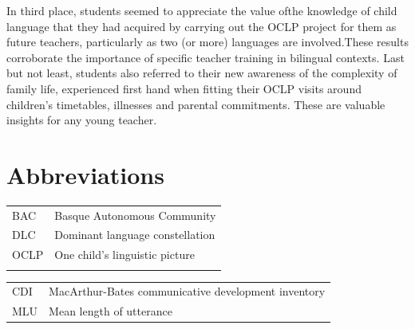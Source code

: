\documentclass[output=paper]{../langscibook}
\begin{document}
In third place, students seemed to appreciate the value ofthe knowledge of child language that they had acquired by carrying out the OCLP project for them as future teachers, particularly as two (or more) languages are involved.These results corroborate the importance of specific teacher training in bilingual contexts.  Last but not least, students also referred to their new awareness of the complexity of family life, experienced first hand when fitting their OCLP visits around children's timetables, illnesses and parental commitments. These are valuable insights for any young teacher.  


\section{Abbreviations}
\label{sec:abbreviations}

\begin{tabular}{@{}ll}
BAC & Basque Autonomous Community\\
DLC & Dominant language constellation\\
OCLP & One child's linguistic picture\\
\\
\end{tabular}
\begin{tabularx}{.45\textwidth}{lX}
CDI & MacArthur-Bates communicative development inventory\\
MLU & Mean length of utterance\\
\end{tabularx}



\sloppy\printbibliography[heading=subbibliography,notkeyword=this]
\end{document}
